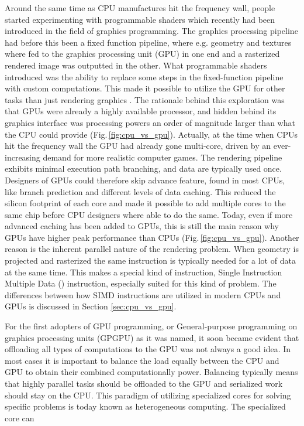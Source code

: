 Around the same time as CPU manufactures hit the frequency wall, people started experimenting with programmable shaders which recently had been introduced in the field of graphics programming. The graphics processing pipeline had before this been a fixed function pipeline, where e.g. geometry and textures where fed to the graphics processing unit (GPU) in one end and a rasterized rendered image was outputted in the other. What programmable shaders  introduced was the ability to replace some steps in the fixed-function pipeline with custom computations. This made it possible to utilize the GPU for other tasks than just rendering graphics \cite{Seland2007}. The rationale behind this exploration was that GPUs were already a highly available processor, and hidden behind its graphics interface was processing powers an order of magnitude larger than what the CPU could provide (Fig.\,\ref{fig:cpu_vs_gpu}). Actually, at the time when CPUs hit the frequency wall the GPU had already gone multi-core, driven by an ever-increasing demand for more realistic computer games. The rendering pipeline exhibits minimal execution path branching, and data are typically used once. Designers of GPUs could therefore skip advance feature, found in most CPUs, like branch prediction and different levels of data caching. This reduced the silicon footprint of each core and made it possible to add multiple cores to the same chip before CPU designers where able to do the same. Today, even if more advanced caching has been added to GPUs, this is still the main reason why GPUs have higher peak performance than CPUs (Fig.\,\ref{fig:cpu_vs_gpu}). Another reason is the inherent parallel nature of the rendering problem. When geometry is projected and rasterized the same instruction is typically needed for a lot of data at the same time. This makes a special kind of instruction, Single Instruction Multiple Data () instruction, especially suited for this kind of problem. The differences between how SIMD instructions are utilized in modern CPUs and GPUs is discussed in Section \ref{sec:cpu_vs_gpu}.

For the first adopters of GPU programming, or General-purpose programming on graphics processing units (GPGPU) as it was named, it soon became evident that offloading all types of computations to the GPU was not always a good idea. In most cases it is important to balance the load equally between the CPU and GPU to obtain their combined computationally power. Balancing typically means that highly parallel tasks should be offloaded to the GPU and serialized work should stay on the CPU. This paradigm of utilizing specialized cores for solving specific problems is today known as heterogeneous computing. The specialized core can 

